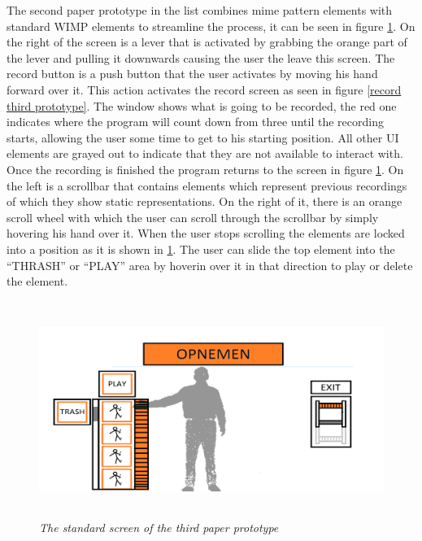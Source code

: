 The second paper prototype in the list combines mime pattern elements with standard WIMP elements to streamline the process, it can be seen in figure \ref{standard third prototype}. On the right of the screen is a lever that is activated by grabbing the orange part of the lever and pulling it downwards causing the user the leave this screen. The record button is a push button that the user activates by moving his hand forward over it. This action activates the record screen as seen in figure \ref{record third prototype}. The window shows what is going to be recorded, the red one indicates where the program will count down from three until the recording starts, allowing the user some time to get to his starting position. All other UI elements are grayed out to indicate that they are not available to interact with. Once the recording is finished the program returns to the screen in figure \ref{standard third prototype}. On the left is a scrollbar that contains elements which represent previous recordings of which they show static representations. On the right of it, there is an orange scroll wheel with which the user can scroll through the scrollbar by simply hovering his hand over it. When the user stops scrolling the elements are locked into a position as it is shown in \ref{standard third prototype}. The user can slide the top element into the ``THRASH'' or ``PLAY'' area by hoverin over it in that direction to play or delete the element.\\


\begin{figure}[H]
	\begin{center}
		\includegraphics[width=12.5cm, height=7cm]{figures/prototype_5_3_standard.png}
		\caption{\emph{The standard screen of the third paper prototype}}
		\label{standard third prototype}
	\end{center}
\end{figure}

